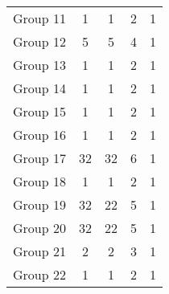 \begin{table}[H]
\begin{tabular}{@{}rcccc@{}}
        Group 11 & 1                               & 1                                         & 2                                          & 1                                      \\
        Group 12 & 5                               & 5                                         & 4                                          & 1                                      \\
        Group 13 & 1                               & 1                                         & 2                                          & 1                                      \\
        Group 14 & 1                               & 1                                         & 2                                          & 1                                      \\
        Group 15 & 1                               & 1                                         & 2                                          & 1                                      \\
        Group 16 & 1                               & 1                                         & 2                                          & 1                                      \\
        Group 17 & 32                              & 32                                        & 6                                          & 1                                      \\
        Group 18 & 1                               & 1                                         & 2                                          & 1                                      \\
        Group 19 & 32                              & 22                                        & 5                                          & 1                                      \\
        Group 20 & 32                              & 22                                        & 5                                          & 1                                      \\
        Group 21 & 2                               & 2                                         & 3                                          & 1                                      \\
        Group 22 & 1                               & 1                                         & 2                                          & 1                                      \\

\end{tabular}
\end{table}

